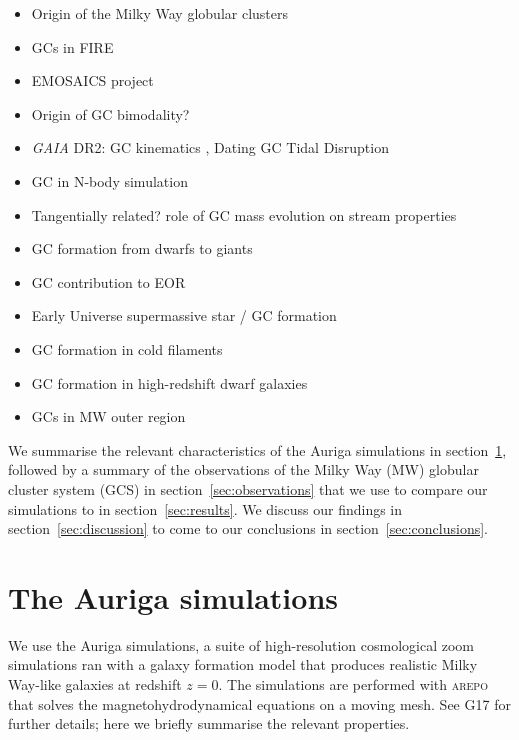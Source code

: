 \documentclass[a4paper,fleqn,usenatbib]{mnras}
\begin{document}
\begin{itemize}
\item Origin of the Milky Way globular clusters \citep{2017MNRAS.465.3622R}
\item GCs in FIRE \citep{2018MNRAS.474.4232K}
\item EMOSAICS project \citep{2018MNRAS.475.4309P}
\item Origin of GC bimodality? \citep{2018MNRAS.479..200F}
\item \textit{GAIA} DR2: GC kinematics \citep{2018A&A...616A..12G}, Dating GC Tidal Disruption \citep{2018ApJ...859L..13B}
\item GC in N-body simulation \citep{2018ApJ...861...69C}
\item Tangentially related? role of GC mass evolution on stream properties \citep{2018MNRAS.474.2479B}
\item GC formation from dwarfs to giants \citep{2018MNRAS.480.2343C}
\item GC contribution to EOR \citep{2018MNRAS.479..332B}
\item Early Universe supermassive star / GC formation \citep{2018MNRAS.478.2461G}
\item GC formation in cold filaments \citep{2018ApJ...861..148M}
\item GC formation in high-redshift dwarf galaxies \citep{2018MNRAS.477..480Z}
\item GCs in MW outer region \citep{2017arXiv170804542P}
\end{itemize}


We summarise the relevant characteristics of the Auriga simulations in section~\ref{sec:auriga}, followed by a summary of the observations of the Milky Way (MW) globular cluster system (GCS) in section~\ref{sec:observations} that we use to compare our simulations to in section~\ref{sec:results}. We discuss our findings in section~\ref{sec:discussion} to come to our conclusions in section~\ref{sec:conclusions}.


\section{The Auriga simulations}
\label{sec:auriga}
We use the Auriga \citep[][hereafter G17]{2017MNRAS.467..179G} simulations, a suite of high-resolution cosmological zoom simulations ran with a galaxy formation model that produces realistic Milky Way-like galaxies at redshift $z=0$. The simulations are performed with \textsc{arepo} \citep{2010MNRAS.401..791S, 2016MNRAS.455.1134P} that solves the magnetohydrodynamical equations on a moving mesh. See G17 for further details; here we briefly summarise the relevant properties.
\end{document}
